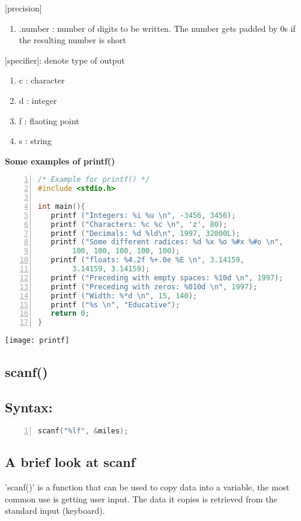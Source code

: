 \documentclass[12pt, letterpaper]{report}
\begin{document}
[precision]
\begin{enumerate}
	\item .number : number of digits to be written. The number gets padded by 0s if the resulting number is short
\end{enumerate}

[specifier]: denote type of output
\begin{enumerate}
	\item c : character
	\item d : integer
	\item f : flaoting point
	\item s : string
\end{enumerate}

\textbf{Some examples of printf()}
\begin{lstlisting}[language=C,framexleftmargin=5mm,frame=single,xleftmargin=18pt,numbers=left,numberstyle=\tiny]
/* Example for printf() */
#include <stdio.h>

int main(){
   printf ("Integers: %i %u \n", -3456, 3456);
   printf ("Characters: %c %c \n", 'z', 80);
   printf ("Decimals: %d %ld\n", 1997, 32000L);
   printf ("Some different radices: %d %x %o %#x %#o \n", 
   		100, 100, 100, 100, 100);
   printf ("floats: %4.2f %+.0e %E \n", 3.14159, 
   		3.14159, 3.14159);
   printf ("Preceding with empty spaces: %10d \n", 1997);
   printf ("Preceding with zeros: %010d \n", 1997);
   printf ("Width: %*d \n", 15, 140);
   printf ("%s \n", "Educative");
   return 0;
}
\end{lstlisting}

\begin{center}
\texttt{[image: printf]}
\end{center}

\subsection{scanf()}
\subsection*{Syntax:}
\begin{lstlisting}[language=C,framexleftmargin=5mm,frame=single,xleftmargin=18pt,numbers=left,numberstyle=\tiny]
scanf("%lf", &miles);
\end{lstlisting}

\subsection*{A brief look at scanf}
'scanf()' is a function that can be used to  copy data into a variable, the most 
common use is getting user input. The data it copies is retrieved from the 
standard input (keyboard). \\\\
\end{document}
